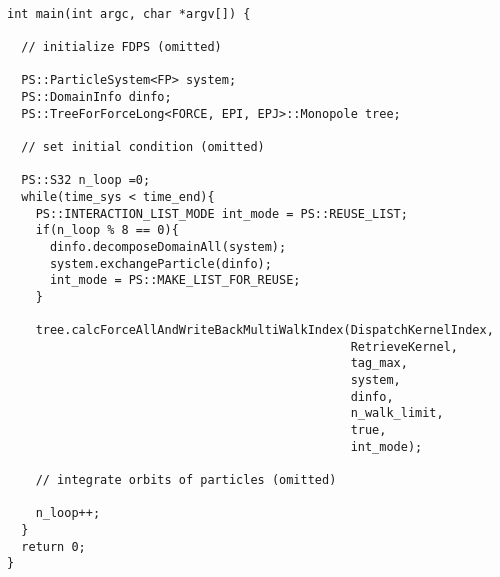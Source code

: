 \documentclass[10pt,onecolumn,a4paper,fleqn]{article}
\begin{document}

\begin{mdframed}[
    backgroundcolor=bg,
    topline=false,
    bottomline=false,
    leftline=false,
    rightline=false]
  \begin{verbatim}

int main(int argc, char *argv[]) {
      
  // initialize FDPS (omitted)
  
  PS::ParticleSystem<FP> system;
  PS::DomainInfo dinfo;
  PS::TreeForForceLong<FORCE, EPI, EPJ>::Monopole tree;

  // set initial condition (omitted)

  PS::S32 n_loop =0;
  while(time_sys < time_end){
    PS::INTERACTION_LIST_MODE int_mode = PS::REUSE_LIST;
    if(n_loop % 8 == 0){
      dinfo.decomposeDomainAll(system);
      system.exchangeParticle(dinfo);
      int_mode = PS::MAKE_LIST_FOR_REUSE;
    }
    
    tree.calcForceAllAndWriteBackMultiWalkIndex(DispatchKernelIndex,
                                                RetrieveKernel,
                                                tag_max,
                                                system,
                                                dinfo,
                                                n_walk_limit,
                                                true,
                                                int_mode);

    // integrate orbits of particles (omitted)

    n_loop++;
  }
  return 0;
}
  
  \end{verbatim}
\end{mdframed}

\end{document}
